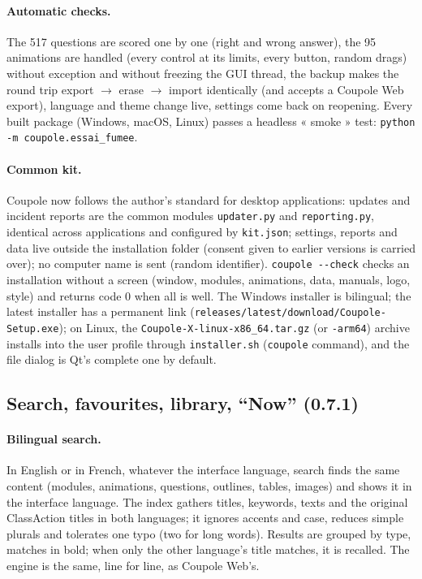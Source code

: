 \paragraph{Automatic checks.} The 517 questions are scored one by one (right and wrong answer), the 95 animations are
handled (every control at its limits, every button, random drags) without exception and without freezing the GUI
thread, the backup makes the round trip export $\to$ erase $\to$ import identically (and accepts a Coupole Web export),
language and theme change live, settings come back on reopening. Every built package (Windows, macOS, Linux) passes a
headless « smoke » test: \texttt{python -m coupole.essai\_fumee}.

\paragraph{Common kit.} Coupole now follows the author's standard for desktop applications: updates and incident
reports are the common modules \texttt{updater.py} and \texttt{reporting.py}, identical across applications and
configured by \texttt{kit.json}; settings, reports and data live outside the installation folder (consent given to
earlier versions is carried over); no computer name is sent (random identifier). \texttt{coupole -{}-check} checks an
installation without a screen (window, modules, animations, data, manuals, logo, style) and returns code 0 when all
is well. The Windows installer is bilingual; the latest installer has a permanent link
(\texttt{releases/latest/download/Coupole-Setup.exe}); on Linux, the \texttt{Coupole-X-linux-x86\_64.tar.gz} (or
\texttt{-arm64}) archive installs into the user profile through \texttt{installer.sh} (\texttt{coupole} command), and
the file dialog is Qt's complete one by default.

\subsection{Search, favourites, library, “Now” (0.7.1)}\label{sec:favoris}
\paragraph{Bilingual search.} In English or in French, whatever the interface language, search finds the same content
(modules, animations, questions, outlines, tables, images) and shows it in the interface language. The index gathers
titles, keywords, texts and the original ClassAction titles in both languages; it ignores accents and case, reduces
simple plurals and tolerates one typo (two for long words). Results are grouped by type, matches in bold; when only the
other language's title matches, it is recalled. The engine is the same, line for line, as Coupole Web's.

